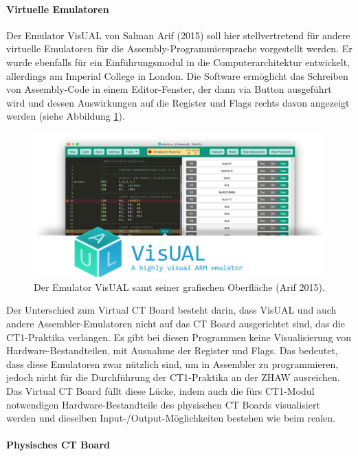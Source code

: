 \documentclass[10pt]{article}
\begin{document}
\paragraph{Virtuelle Emulatoren}
Der Emulator VisUAL von Salman Arif (2015) soll hier stellvertretend für andere virtuelle Emulatoren für die Assembly-Programmiersprache vorgestellt werden. Er wurde ebenfalls für ein Einführungsmodul in die Computerarchitektur entwickelt, allerdings am Imperial College in London. Die Software ermöglicht das Schreiben von Assembly-Code in einem Editor-Fenster, der dann via Button ausgeführt wird und dessen Auswirkungen auf die Register und Flags rechts davon angezeigt werden (siehe Abbildung \ref{emulator}).
\begin{figure}[h]
\includegraphics[width=\textwidth]{visual_emulator}
\caption{Der Emulator VisUAL samt seiner grafischen Oberfläche (Arif 2015).}
\label{emulator}
\end{figure}
Der Unterschied zum \glqq Virtual CT Board\grqq{} besteht darin, dass VisUAL und auch andere Assembler-Emulatoren nicht auf das CT Board ausgerichtet sind, das die CT1-Praktika verlangen. Es gibt bei diesen Programmen keine Visualisierung von Hardware-Bestandteilen, mit Ausnahme der Register und Flags. Das bedeutet, dass diese Emulatoren zwar nützlich sind, um in Assembler zu programmieren, jedoch nicht für die Durchführung der CT1-Praktika an der ZHAW ausreichen. Das \glqq Virtual CT Board\grqq{} füllt diese Lücke, indem auch die fürs CT1-Modul notwendigen Hardware-Bestandteile des physischen CT Boards visualisiert werden und dieselben Input-/Output-Möglichkeiten bestehen wie beim realen.

\paragraph{Physisches CT Board} 
\end{document}
